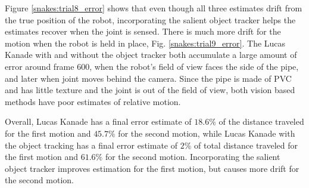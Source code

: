 \documentclass[letterpaper, 10 pt, conference]{ieeeconf}
\begin{document}
Figure \ref{snakes:trial8_error} shows that even though all three estimates drift from the true position of the robot, incorporating the salient object tracker helps the estimates recover when the joint is sensed. There is much more drift for the motion when the robot is held in place, Fig. \ref{snakes:trial9_error}. The Lucas Kanade with and without the object tracker both accumulate a large amount of error around frame 600, when the robot's field of view faces the side of the pipe, and later when joint moves behind the camera. Since the pipe is made of PVC and has little texture and the joint is out of the field of view, both vision based methods have poor estimates of relative motion. 

Overall, Lucas Kanade has a final error estimate of $18.6 \%$ of the distance traveled for the first motion and $45.7 \%$ for the second motion, while Lucas Kanade with the object tracking has a final error estimate of $2 \%$ of total distance traveled for the first motion and $61.6 \%$ for the second motion. Incorporating the salient object tracker improves estimation for the first motion, but causes more drift for the second motion.
\end{document}

